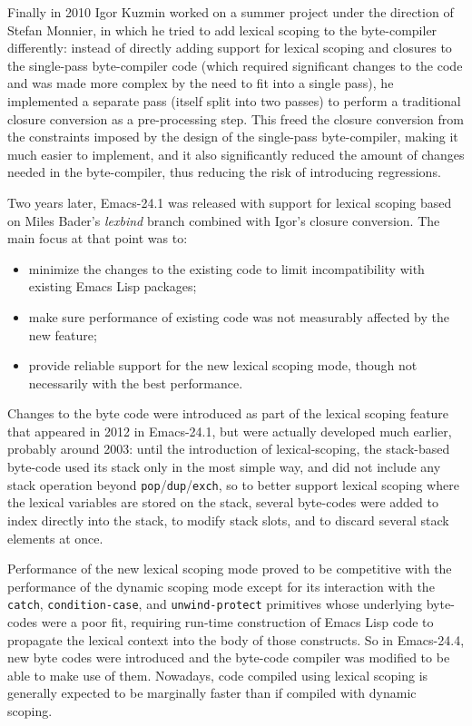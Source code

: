 \documentclass[format=acmsmall, review]{acmart}
\newcommand \Elisp {Emacs Lisp}
\begin{document}
Finally in 2010 Igor Kuzmin worked on a summer project under the direction
of Stefan Monnier, in which he tried to add lexical scoping to the
byte-compiler differently:
instead of directly adding support for lexical scoping and closures to the
single-pass byte-compiler code (which required significant changes to the
code and was made more complex by the need to fit into a single pass), he
implemented a separate pass (itself split into two passes) to perform
a traditional closure conversion as a pre-processing step.  This freed the
closure conversion from the constraints imposed by the design of the
single-pass byte-compiler, making it much easier to implement, and it also
significantly reduced the amount of changes needed in the byte-compiler,
thus reducing the risk of introducing regressions.

Two years later, Emacs-24.1 was released with support for lexical
scoping based on Miles Bader's \emph{lexbind} branch combined with Igor's
closure conversion.  The main focus at that point was to:
\begin{itemize}
\item minimize the changes to the existing code to limit incompatibility
  with existing \Elisp{} packages;
\item make sure performance of existing code was not measurably affected by
  the new feature;
\item provide reliable support for the new lexical scoping mode, though not
  necessarily with the best performance.
\end{itemize}
Changes to the byte code were introduced as part of the lexical scoping
feature that appeared in 2012 in Emacs-24.1, but were actually developed
much earlier, probably around 2003: until the introduction of
lexical-scoping, the stack-based byte-code used its stack only in the most
simple way, and did not include any stack operation beyond
\texttt{pop}/\texttt{dup}/\texttt{exch}, so to better support lexical
scoping where the lexical variables are stored on the stack, several
byte-codes were added to index directly into the stack, to modify stack
slots, and to discard several stack elements at once.

Performance of the new lexical scoping mode proved to be competitive with
the performance of the dynamic scoping mode except for its interaction with
the \texttt{catch}, \texttt{condition-case}, and \texttt{unwind-protect}
primitives whose underlying byte-codes were a poor fit, requiring run-time
construction of \Elisp{} code to propagate the lexical context into the body
of those constructs.
So in Emacs-24.4, new byte codes were introduced and
the byte-code compiler was modified to be able to make use of them.  Nowadays,
code compiled using lexical scoping is generally expected to be marginally
faster than if compiled with dynamic scoping.
\end{document}
